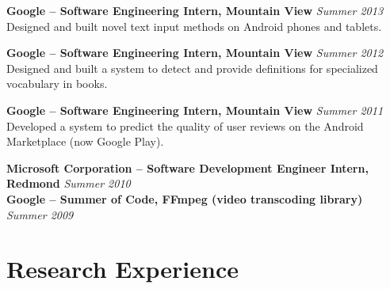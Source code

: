 \documentclass[margin,line]{resume}
\begin{document}
\begin{resume}
\textbf{Google -- Software Engineering Intern, Mountain View} \hfill \textsl{Summer 2013}\\
Designed and built novel text input methods on Android phones and tablets.

\textbf{Google -- Software Engineering Intern, Mountain View} \hfill \textsl{Summer 2012}\\
Designed and built a system to detect and provide definitions for specialized vocabulary in books. %

\textbf{Google -- Software Engineering Intern, Mountain View} \hfill \textsl{Summer 2011}\\
Developed a system to predict the quality of user reviews on the Android Marketplace (now Google Play). %

\textbf{Microsoft Corporation -- Software Development Engineer Intern, Redmond} \hfill \textsl{Summer 2010}\\
\textbf{Google -- Summer of Code, FFmpeg (video transcoding library)} \hfill \textsl{Summer 2009}\\



\vspace{-3mm}

\section{\mysidestyle Research Experience}


\end{resume}
\end{document}
